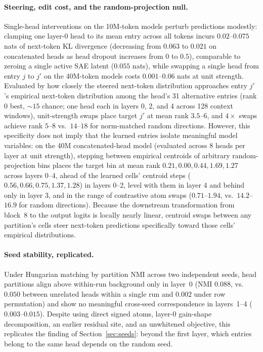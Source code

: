 \paragraph{Steering, edit cost, and the random-projection null.} Single-head
interventions on the 10M-token models perturb predictions modestly: clamping
one layer-0 head to its mean entry across all tokens incurs $0.02$--$0.075$
nats of next-token KL divergence (decreasing from $0.063$ to $0.021$ on
concatenated heads as head dropout increases from $0$ to $0.5$), comparable
to zeroing a single active SAE latent ($0.055$ nats), while swapping a
single head from entry $j$ to $j'$ on the 40M-token models costs
$0.001$--$0.06$ nats at unit strength. Evaluated by how closely the steered
next-token distribution approaches entry $j'$'s empirical next-token
distribution among the head's 31 alternative entries (rank 0 best, ${\sim}15$
chance; one head each in layers 0, 2, and 4 across 128 context windows),
unit-strength swaps place target $j'$ at mean rank $3.5$--$6$, and $4\times$
swaps achieve rank $5$--$8$ vs.\ $14$--$18$ for norm-matched random
directions. However, this specificity does not imply that the learned
entries isolate meaningful model variables: on the 40M concatenated-head
model (evaluated across 8 heads per layer at unit strength), stepping
between empirical centroids of arbitrary random-projection bins places the
target bin at mean rank $0.21, 0.00, 0.44, 1.69, 1.27$ across layers 0--4,
ahead of the learned cells' centroid steps ($0.56, 0.66, 0.75, 1.37,
1.28$) in layers 0--2, level with them in layer 4 and behind only in
layer 3, and in the range of contrastive atom swaps ($0.71$--$1.94$, vs.\
$14.2$--$16.9$ for random directions). Because the downstream transformation
from block~8 to the output logits is locally nearly linear, centroid swaps
between any partition's cells steer next-token predictions specifically
toward those cells' empirical distributions.

\paragraph{Seed stability, replicated.} Under Hungarian matching by
partition NMI across two independent seeds, head partitions align above
within-run background only in layer~0 (NMI $0.088$, vs.\ $0.050$ between
unrelated heads within a single run and $0.002$ under row permutation) and
show no meaningful cross-seed correspondence in layers~1--4
($0.003$--$0.015$). Despite using direct signed atoms, layer-0 gain-shape
decomposition, an earlier residual site, and an unwhitened objective, this
replicates the finding of Section~\ref{sec:seeds}: beyond the first layer,
which entries belong to the same head depends on the random seed.

